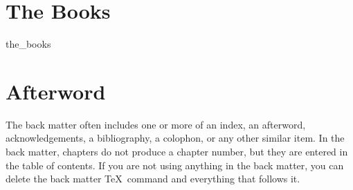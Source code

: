 \documentclass{book}%
\begin{document}
\chapter{The Books}
{the_books}

\chapter*{Afterword}

The back matter often includes one or more of an index, an afterword,
acknowledgements, a bibliography, a colophon, or any other similar
item. In the back matter, chapters do not produce a chapter number,
but they are entered in the table of contents. If you are not using
anything in the back matter, you can delete the back matter \TeX\ command
and everything that follows it.

\printbibliography

%
%
\end{document}
